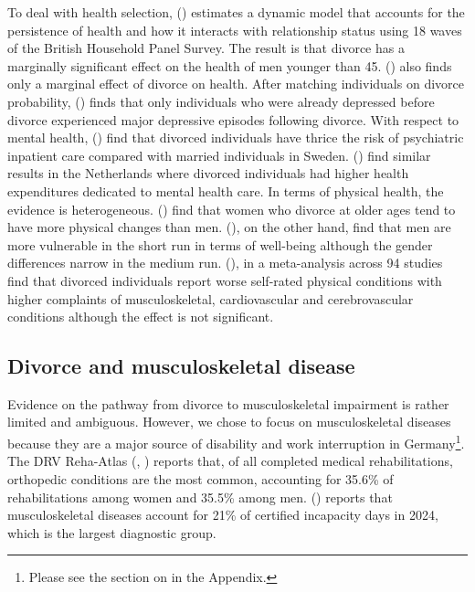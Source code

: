 \documentclass[a4paper,12pt]{article}
\theoremstyle{plain}
\theoremstyle{definition}
\theoremstyle{TheoremNum}
\theoremstyle{CorollaryNum}
\theoremstyle{PropositionNum}
\theoremstyle{TheoremNum}
\begin{document}
To deal with health selection, \citeauthor{kohn2014effect} (\citeyear{kohn2014effect}) estimates a dynamic model that accounts for the persistence of health and how it interacts with relationship status using 18 waves of the British Household Panel Survey. The result is that divorce has a marginally significant effect on the health of men younger than 45. \citeauthor*{sbarra2014marital} (\citeyear{sbarra2014marital}) also finds only a marginal effect of divorce on health. After matching individuals on divorce probability, \citeauthor*{sbarra2014marital} (\citeyear{sbarra2014marital}) finds that only individuals who were already depressed before divorce experienced major depressive episodes following divorce. With respect to mental health, \citeauthor{bjorkenstam2013risk} (\citeyear{bjorkenstam2013risk}) find that divorced individuals have thrice the risk of psychiatric inpatient care compared with married individuals in Sweden. \citeauthor{meulman2023estimating} (\citeyear{meulman2023estimating}) find similar results in the Netherlands where divorced individuals had higher health expenditures dedicated to mental health care. In terms of physical health, the evidence is heterogeneous. \citeauthor{zulkarnain2019divorce} (\citeyear{zulkarnain2019divorce}) find that women who divorce at older ages tend to have more physical changes than men. \citeauthor{leopold2018gender} (\citeyear{leopold2018gender}), on the other hand, find that men are more vulnerable in the short run in terms of well-being although the gender differences narrow in the medium run. \citeauthor{pellon2024divorce} (\citeyear{pellon2024divorce}), in a meta-analysis across 94 studies find that divorced individuals report worse self-rated physical conditions with higher complaints of musculoskeletal, cardiovascular and cerebrovascular conditions although the effect is not significant.


\subsection{Divorce and musculoskeletal disease}

Evidence on the pathway from divorce to musculoskeletal impairment is rather limited and ambiguous. However, we chose to focus on musculoskeletal diseases because they are a major source of disability and work interruption in Germany\footnote{Please see the section on  in the Appendix.}. The DRV Reha-Atlas (\citeauthor{drv2024rehaatlas}, \citeyear{drv2024rehaatlas}) reports that, of all completed medical rehabilitations, orthopedic conditions are the most common, accounting for 35.6\% of rehabilitations among women and 35.5\% among men. \citeauthor{baua2026arbeitswelt} (\citeyear{baua2026arbeitswelt}) reports that musculoskeletal diseases account for 21\% of certified incapacity days in 2024, which is the largest diagnostic group. 
\end{document}
